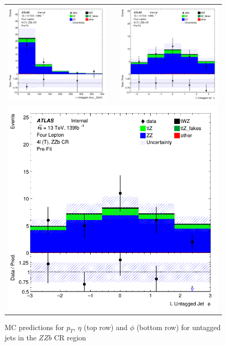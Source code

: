 \begin{figure}[htbp]
\centering
  \begin{tabular}{ccc}

    \includegraphics[width=.2\textwidth]{figures/PreFitPlots/lep4_ZZb_4T_L_UntaggedJet_pt} & &
    \includegraphics[width=.2\textwidth]{figures/PreFitPlots/lep4_ZZb_4T_L_UntaggedJet_eta} \\
    \multicolumn{3}{c}{\includegraphics[width=.2\textwidth]{figures/PreFitPlots/lep4_ZZb_4T_L_UntaggedJet_phi}}
  \end{tabular}
      \caption{MC predictions for $p_{T}$, $\eta$ (top row) and $\phi$ (bottom row) for untagged jets in the $ZZb$ CR region }
  \label{fig:4lep-ZZb-CR-UntaggedjetPlots}
\end{figure}
\clearpage

